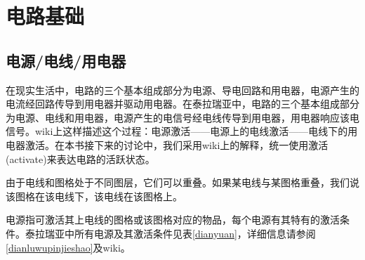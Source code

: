 \chapter{电路基础}\label{dianlujichu}

\section{电源/电线/用电器}

在现实生活中，电路的三个基本组成部分为电源、导电回路和用电器，电源产生的电流经回路传导到用电器并驱动用电器。在泰拉瑞亚中，电路的三个基本组成部分为电源、电线和用电器，电源产生的电信号经电线传导到用电器，用电器响应该电信号。wiki上这样描述这个过程：电源激活——电源上的电线激活——电线下的用电器激活。在本书接下来的讨论中，我们采用wiki上的解释，统一使用激活(activate)来表达电路的活跃状态。

由于电线和图格处于不同图层，它们可以重叠。如果某电线与某图格重叠，我们说该图格在该电线下，该电线在该图格上。

电源指可激活其上电线的图格或该图格对应的物品，每个电源有其特有的激活条件。泰拉瑞亚中所有电源及其激活条件见表\ref{dianyuan}，详细信息请参阅\autoref{dianluwupinjieshao}及wiki。

